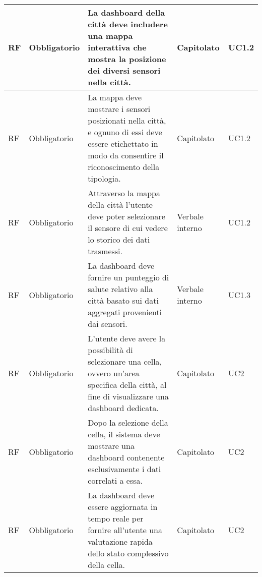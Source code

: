 \begin{longtable}{|C{1cm}|C{2cm}|>{\raggedright}m{5cm}|C{2cm}|C{1.5cm}|}
    \hline
     RF & Obbligatorio        & La dashboard della città deve includere una mappa interattiva che mostra la posizione dei diversi sensori nella città.                                                                                                             & Capitolato      & UC1.2                   \\
    \hline
     RF & Obbligatorio        & La mappa deve mostrare i sensori posizionati nella città, e ognuno di essi deve essere etichettato in modo da consentire il riconoscimento della tipologia.                                                                         & Capitolato      & UC1.2               \\
    \hline
     RF & Obbligatorio        & Attraverso la mappa della città l'utente deve poter selezionare il sensore di cui vedere lo storico dei dati trasmessi.       & Verbale interno      & UC1.2               \\
    \hline
     RF & Obbligatorio        & La dashboard deve fornire un punteggio di salute relativo alla città basato sui dati aggregati provenienti dai sensori.                                                                                                            & Verbale interno & UC1.3                    \\
    \hline
    \hline
     RF & Obbligatorio        & L'utente deve avere la possibilità di selezionare una cella, ovvero un'area specifica della città, al fine di visualizzare una dashboard dedicata.& Capitolato      & UC2              \\
    \hline
     RF & Obbligatorio        & Dopo la selezione della cella, il sistema deve mostrare una dashboard contenente esclusivamente i dati correlati a essa.                                                                                                           & Capitolato      & UC2               \\
    \hline
     RF & Obbligatorio        & La dashboard deve essere aggiornata in tempo reale per fornire all'utente una valutazione rapida dello stato complessivo della cella.                                                                                              & Capitolato      & UC2               \\

\end{longtable}
